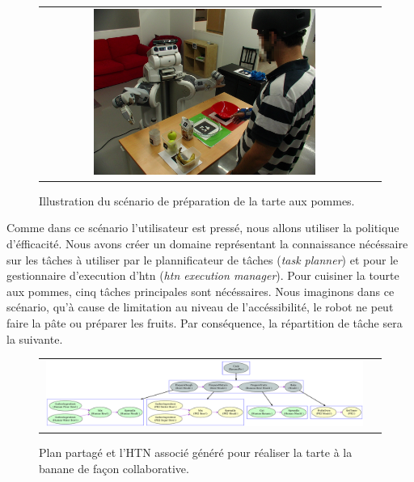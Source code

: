 \documentclass[a4paper,11pt,twoside]{StyleThese}
\begin{document}
\begin{figure}[ht!]

 \centering
 \begin{tabular}{cc}
  \includegraphics[width=0.69\textwidth]{img/scenario.JPG}
 \end{tabular}
 \caption{Illustration du scénario de préparation de la tarte aux pommes.}
 \label{fig:scenario}
 \end{figure}

Comme dans ce scénario l'utilisateur est pressé, nous allons utiliser la politique d'éfficacité.
Nous avons créer un domaine représentant la connaissance nécéssaire sur les tâches à utiliser par le plannificateur de tâches (\textit{task planner}) et pour le gestionnaire d'execution d'htn (\textit{htn execution manager}).
Pour cuisiner la tourte aux pommes, cinq tâches principales sont nécéssaires. Nous imaginons dans ce scénario, qu'à cause de limitation au niveau de l'accéssibilité, le robot ne peut faire la pâte ou préparer les fruits. Par conséquence, la répartition de tâche sera la suivante.

\begin{figure}[ht!]

 \centering
 \begin{tabular}{cc}
  \includegraphics[width=0.99\textwidth]{img/bananaPie.pdf}
 \end{tabular}
 \caption{Plan partagé et l'HTN associé généré pour réaliser la tarte à la banane de façon collaborative.}
 \label{fig:bananaPlan}
 \end{figure}
 
\end{document}
